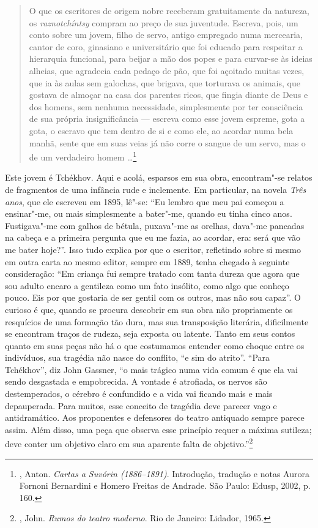 \begin{quotation}
O que os escritores de origem nobre receberam gratuitamente da
natureza, os \emph{raznotchíntsy} compram ao preço de sua
juventude. Escreva, pois, um conto sobre um jovem, filho de
servo, antigo empregado numa mercearia, cantor de coro, ginasiano
e universitário que foi educado para respeitar a hierarquia
funcional, para beijar a mão dos popes e para curvar-se às
ideias alheias, que agradecia cada pedaço de pão, que foi açoitado
muitas vezes, que ia às aulas sem galochas, que brigava, que
torturava os animais, que gostava de almoçar na casa dos parentes
ricos, que fingia diante de Deus e dos homens, sem nenhuma
necessidade, simplesmente por ter consciência de sua própria
insignificância --- escreva como esse jovem espreme, gota a gota,
o escravo que tem dentro de si e como ele, ao acordar numa bela
manhã, sente que em suas veias já não corre o sangue de um servo,
mas o de um verdadeiro homem \ldots{}\footnote{,
Anton. \emph{Cartas a Suvórin (1886--1891)}. Introdução, tradução
e notas Aurora Fornoni Bernardini e Homero Freitas de Andrade.
São Paulo: Edusp, 2002, p. 160.}
\end{quotation}

Este jovem é Tchékhov. Aqui e acolá, esparsos em sua obra,
encontram"-se relatos de fragmentos de uma infância rude e
inclemente. Em particular, na novela \emph{Três anos}, que
ele escreveu em 1895, lê"-se: ``Eu lembro que meu pai começou
a ensinar"-me, ou mais simplesmente a bater"-me, quando eu
tinha cinco anos. Fustigava"-me com galhos de bétula, puxava"-me
as orelhas, dava"-me pancadas na cabeça e a primeira pergunta que
eu me fazia, ao acordar, era: será que vão me bater hoje?''. Isso
tudo explica por que o escritor, refletindo sobre si mesmo em
outra carta ao mesmo editor, sempre em 1889, tenha chegado à
seguinte consideração: ``Em criança fui sempre tratado com
tanta dureza que agora que sou adulto encaro a gentileza como
um fato insólito, como algo que conheço pouco. Eis por que
gostaria de ser gentil com os outros, mas não sou capaz''.
O curioso é que, quando se procura descobrir em sua obra não
propriamente os resquícios de uma formação tão dura, mas sua
transposição literária, dificilmente se encontram traços de
rudeza, seja exposta ou latente. Tanto em seus contos quanto
em suas peças não há o que costumamos entender como choque
entre os indivíduos, sua tragédia não nasce do conflito, ``e sim
do atrito''. ``Para Tchékhov'', diz John Gassner, ``o mais
trágico numa vida comum é que ela vai sendo desgastada e
empobrecida. A vontade é atrofiada, os nervos são destemperados,
o cérebro é confundido e a vida vai ficando mais e mais
depauperada. Para muitos, esse conceito de tragédia deve parecer
vago e antidramático. Aos proponentes e defensores do teatro
antiquado sempre parece assim. Além disso, uma peça que observa
esse princípio requer a máxima sutileza; deve conter um objetivo
claro em sua aparente falta de objetivo.''\footnote{, John. \emph{Rumos do teatro moderno}. Rio de Janeiro: Lidador, 1965.}

